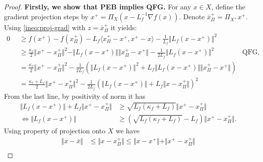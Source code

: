 \documentclass[12pt]{report}
\begin{document}
            \begin{proof}
                \textbf{Firstly, we show that PEB implies QFG.}
                For any $x \in X$, define the gradient projection steps by $x^+ = \Pi_{X}(x - L^{-1}_f\nabla f(x))$. 
                Denote $\bar x^+_\Pi = \Pi_{X^+}x^+$. 
                Using \eqref{ineq:proj-grad} with $z = \bar x^+_\Pi$ it yields: 
                {\small
                \begin{align*}
                    0 &\ge 
                    f(x^+) - f(x^+_\Pi) - L_f\langle x_\Pi^+ - x^+, x^+ - x\rangle
                    - \frac{1}{L_f}\Vert L_f(x - x^+)\Vert^2
                    \\
                    \quad&\ge 
                    \frac{\kappa_f}{2}\Vert x^+ - x_\Pi^+\Vert^2
                    - \Vert L_f(x - x^+)\Vert\Vert x^+_\Pi - x^+\Vert
                    - \frac{1}{2L_f}\Vert L_f(x - x^+)\Vert^2   &\text{QFG, Cauchy}
                    \\
                    &= \frac{\kappa_f}{2}\Vert x^+ - x_\Pi^+\Vert^2
                    - \frac{1}{2L_f}\left(
                        \Vert L_f(x - x^+)\Vert^2
                        + L_f\Vert L_f(x - x^+)\Vert\Vert x_\Pi^+ - x^+\Vert
                    \right)
                    \\
                    &= 
                    \frac{\kappa_f + L_f}{2}\Vert x^+ - x^+_\Pi\Vert^2
                    - \frac{1}{2L_f}\left(
                        \Vert L_f(x - x^+)\Vert + L_f\Vert x - x_\Pi^+\Vert
                    \right)^2
                \end{align*}
                }
                From the last line, by positivity of norm it has
                \begin{align*}
                    \Vert L_f(x - x^+)\Vert + L_f\Vert x^+ - x_\Pi^+\Vert
                    &\ge \sqrt{L_f(\kappa_f + L_f)}\Vert x^+ - x^+_\Pi\Vert
                    \\
                    \iff 
                    \Vert L_f(x - x^+)\Vert
                    &\ge 
                    \left(\sqrt{L_f(\kappa_f + L_f)} - L_f\right)\Vert x^+ - x^+_\Pi\Vert. 
                \end{align*}
                Using property of projection onto $X$ we have 
                \begin{align*}
                    \Vert x - \bar x\Vert &\le \Vert x - x_\Pi^+\Vert
                    \le \Vert x - x^+\Vert + \Vert x^+ - x^+_\Pi\Vert
                    \\

\end{align*}
\end{proof}
\end{document}

